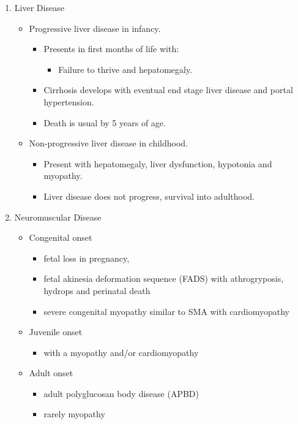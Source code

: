 \documentclass{scrartcl}
\begin{document}
\begin{enumerate}
\item Liver Disease
\label{sec:org7835730}
\begin{itemize}
\item Progressive liver disease in infancy.
\begin{itemize}
\item Presents in first months of life with:
\begin{itemize}
\item Failure to thrive and hepatomegaly.
\end{itemize}
\item Cirrhosis develops with eventual end stage liver disease and
portal hypertension.
\item Death is usual by 5 years of age.
\end{itemize}
\item Non-progressive liver disease in childhood.
\begin{itemize}
\item Present with hepatomegaly, liver dysfunction, hypotonia and
myopathy.
\item Liver disease does not progress, survival into adulthood.
\end{itemize}
\end{itemize}

\item Neuromuscular Disease
\label{sec:orgaa523f2}
\begin{itemize}
\item Congenital onset
\begin{itemize}
\item fetal loss in pregnancy,
\item fetal akinesia deformation sequence (FADS) with athrogryposis, hydrops and perinatal death
\item severe congenital myopathy similar to SMA with \textpm{} cardiomyopathy
\end{itemize}
\item Juvenile onset
\begin{itemize}
\item with a myopathy and/or cardiomyopathy
\end{itemize}
\item Adult onset
\begin{itemize}
\item adult polyglucosan body disease (APBD)
\item rarely myopathy
\end{itemize}
\end{itemize}
\end{enumerate}
\end{document}
